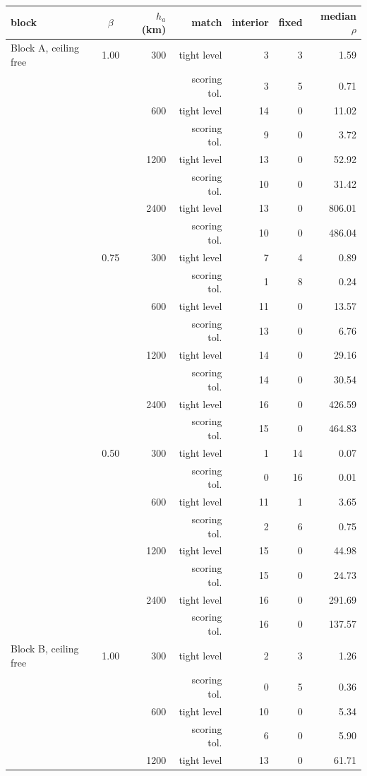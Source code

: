 \begin{tabular}{@{}l c r r r r r@{}}
\toprule
block & $\beta$ & $h_a$ (km) & match & interior & fixed & median $\rho$ \\
\midrule
Block A, ceiling free & 1.00 & 300 & tight level & 3 & 3 & 1.59 \\
 &  &  & scoring tol. & 3 & 5 & 0.71 \\
 &  & 600 & tight level & 14 & 0 & 11.02 \\
 &  &  & scoring tol. & 9 & 0 & 3.72 \\
 &  & 1200 & tight level & 13 & 0 & 52.92 \\
 &  &  & scoring tol. & 10 & 0 & 31.42 \\
 &  & 2400 & tight level & 13 & 0 & 806.01 \\
 &  &  & scoring tol. & 10 & 0 & 486.04 \\
 & 0.75 & 300 & tight level & 7 & 4 & 0.89 \\
 &  &  & scoring tol. & 1 & 8 & 0.24 \\
 &  & 600 & tight level & 11 & 0 & 13.57 \\
 &  &  & scoring tol. & 13 & 0 & 6.76 \\
 &  & 1200 & tight level & 14 & 0 & 29.16 \\
 &  &  & scoring tol. & 14 & 0 & 30.54 \\
 &  & 2400 & tight level & 16 & 0 & 426.59 \\
 &  &  & scoring tol. & 15 & 0 & 464.83 \\
 & 0.50 & 300 & tight level & 1 & 14 & 0.07 \\
 &  &  & scoring tol. & 0 & 16 & 0.01 \\
 &  & 600 & tight level & 11 & 1 & 3.65 \\
 &  &  & scoring tol. & 2 & 6 & 0.75 \\
 &  & 1200 & tight level & 15 & 0 & 44.98 \\
 &  &  & scoring tol. & 15 & 0 & 24.73 \\
 &  & 2400 & tight level & 16 & 0 & 291.69 \\
 &  &  & scoring tol. & 16 & 0 & 137.57 \\
\midrule
Block B, ceiling free & 1.00 & 300 & tight level & 2 & 3 & 1.26 \\
 &  &  & scoring tol. & 0 & 5 & 0.36 \\
 &  & 600 & tight level & 10 & 0 & 5.34 \\
 &  &  & scoring tol. & 6 & 0 & 5.90 \\
 &  & 1200 & tight level & 13 & 0 & 61.71 \\

\end{tabular}
